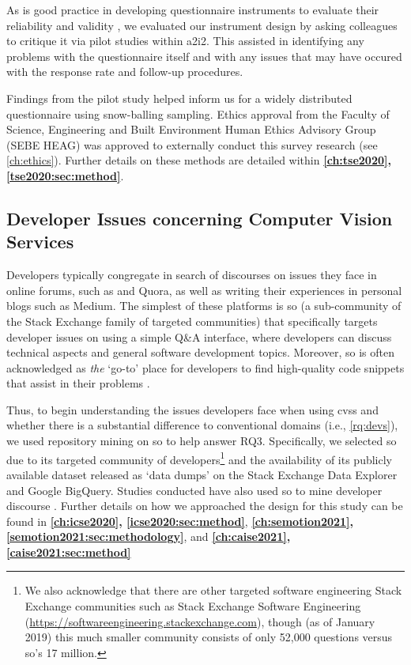 As is good practice in developing questionnaire instruments to evaluate their reliability and validity \citep{Litwin:1995wt}, we evaluated our instrument design by asking colleagues to critique it via pilot studies within \gls{a2i2}. This assisted in identifying any problems with the questionnaire itself and with any issues that may have occured with the response rate and follow-up procedures.

Findings from the pilot study helped inform us for a widely distributed questionnaire using snow-balling sampling. Ethics approval from the Faculty of Science, Engineering and Built Environment Human Ethics Advisory Group (SEBE HEAG) was approved to externally conduct this survey research (see \cref{ch:ethics}). 
Further details on these methods are detailed within \textbf{\cref{ch:tse2020}, \cref{tse2020:sec:method}}.

\subsection{Developer Issues concerning Computer Vision Services}

Developers typically congregate in search of discourses on issues they face in online forums, such as  and Quora, as well as writing their experiences in personal blogs such as Medium. The simplest of these platforms is \gls{so} (a sub-community of the Stack Exchange family of targeted communities) that specifically targets developer issues on using a simple Q\&A interface, where developers can discuss technical aspects and general software development topics. Moreover, \gls{so} is often acknowledged as \textit{the} `go-to' place for developers to find high-quality code snippets that assist in their problems \citep{Subramanian:2014bg}.

Thus, to begin understanding the issues developers face when using \glspl{cvs} and whether there is a substantial difference to conventional domains (i.e., \ref{rq:devs}), we used repository mining on \gls{so} to help answer RQ3. Specifically, we selected \gls{so} due to its targeted community of developers\footnote{We also acknowledge that there are other targeted software engineering Stack Exchange communities such as Stack Exchange Software Engineering (\url{https://softwareengineering.stackexchange.com}), though (as of January 2019) this much smaller community consists of only 52,000 questions versus \gls{so}'s 17 million.} and the availability of its publicly available dataset released as `data dumps' on the Stack Exchange Data Explorer and Google BigQuery. Studies conducted have also used \gls{so} to mine developer discourse \citep{Choi:2015wo,Sinha:2013tt,Novielli:2015vda,Rosen:2016uk,Pal:2012te,Bajaj:2014wg,LinaresVasquez:2014vj,Wang:2013ue,Barua:2012gz,Reboucas:2016tw,Allamanis:2013is,Tahir:2018ks}.
Further details on how we approached the design for this study can be found in \textbf{\cref{ch:icse2020}, \cref{icse2020:sec:method}}, \textbf{\cref{ch:semotion2021}, \cref{semotion2021:sec:methodology}}, and \textbf{\cref{ch:caise2021}, \cref{caise2021:sec:method}}

